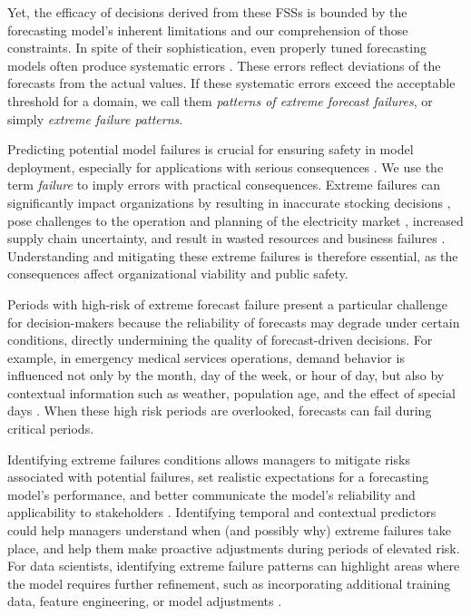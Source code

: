 \documentclass[12pt]{article}
\begin{document}
Yet, the efficacy of decisions derived from these FSSs is bounded by the forecasting model’s inherent limitations and our comprehension of those constraints. In spite of their sophistication, even properly tuned forecasting models often produce systematic errors \citep{eyuboglu2022}. These errors reflect deviations of the forecasts from the actual values. If these systematic errors exceed the acceptable threshold for a domain, we call them \emph{patterns of extreme forecast failures}, or simply %
\emph{extreme failure patterns}.

Predicting potential model failures is crucial for ensuring safety in model deployment, especially for applications with serious consequences \citep{tsiligkaridis2021}. We use the term \emph{failure} to imply errors with practical consequences. Extreme failures can significantly impact organizations by resulting in inaccurate stocking decisions \citep{boylan2021}, pose challenges to the operation and planning of the electricity market \citep{zhu2025}, %
increased supply chain uncertainty, and result in wasted resources and business failures \citep{chae2024}. Understanding and mitigating these extreme failures is therefore essential, as the consequences affect %
organizational viability and public safety.

Periods with high-risk of extreme forecast failure present a particular challenge for decision-makers because the reliability of forecasts may degrade under certain conditions, directly undermining the quality of forecast-driven decisions. For example, in emergency medical services operations, demand behavior is influenced not only by the month, day of the week, or hour of  day, but also by contextual information such as weather, population age, and the effect of special days \citep{abreu2023}. When these high risk periods are overlooked, forecasts can fail during critical periods.

Identifying extreme failures conditions allows managers to mitigate risks associated with potential failures, set realistic expectations for a forecasting model's performance, and better communicate the model's reliability and applicability to stakeholders \citep{cakmak2024}. Identifying temporal and contextual predictors could help managers understand when (and possibly why) extreme failures take place, and help them make proactive adjustments during periods of elevated risk. For data scientists, identifying extreme failure patterns can highlight areas where the model requires further refinement, such as incorporating additional training data, feature engineering, or model adjustments \citep{cakmak2024}. 
\end{document}
